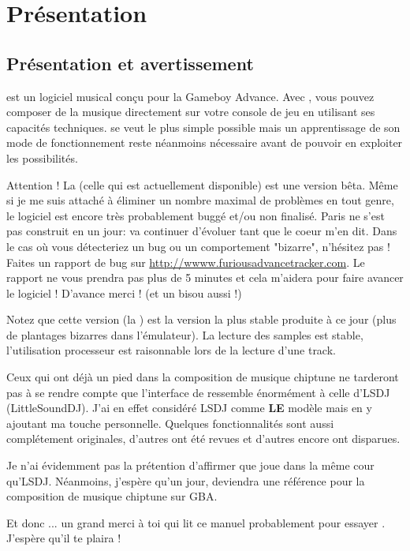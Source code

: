 \documentclass[12pt,a4paper]{article}
\begin{document}
  \section{Présentation}
    \subsection{Présentation et avertissement}
    \FAT est un logiciel musical conçu pour la Gameboy Advance.
    Avec \FAT, vous pouvez composer de la musique directement sur votre console de jeu en utilisant ses capacités techniques.
    \FAT se veut le plus simple possible mais un apprentissage de son mode de fonctionnement reste néanmoins nécessaire avant de pouvoir en exploiter les possibilités.\medskip
    
    Attention ! La \fatversion (celle qui est actuellement disponible) est une version bêta.
    Même si je me suis attaché à éliminer un nombre maximal de problèmes en tout genre, le logiciel est encore très probablement buggé et/ou non finalisé.
    Paris ne s'est pas construit en un jour: \FAT va continuer d'évoluer tant que le coeur m'en dit.
    Dans le cas où vous détecteriez un bug ou un comportement "bizarre", n'hésitez pas !
    Faites un rapport de bug sur \url{http://wwww.furiousadvancetracker.com}.
    Le rapport ne vous prendra pas plus de 5 minutes et cela m'aidera pour faire avancer le logiciel !
    D'avance merci ! (et un bisou aussi !)
    \medskip

    Notez que cette version (la \fatversion) est la version la plus stable produite à ce jour (plus de plantages bizarres dans l'émulateur). La lecture des samples est stable, l'utilisation processeur est raisonnable lors de la lecture d'une track.\medskip
    
    Ceux qui ont déjà un pied dans la composition de musique chiptune ne tarderont pas à se rendre compte que l'interface de \FAT ressemble énormément à celle d'LSDJ (LittleSoundDJ).
    J'ai en effet considéré LSDJ comme {\bf LE} modèle mais en y ajoutant ma touche personnelle.
    Quelques fonctionnalités sont aussi complétement originales, d'autres ont été revues et d'autres encore ont disparues.
    \medskip
    
    Je n'ai évidemment pas la prétention d'affirmer que \FAT joue dans la même cour qu'LSDJ.
    Néanmoins, j'espère qu'un jour, \FAT deviendra une référence pour la composition de musique chiptune sur GBA.\medskip
    
    Et donc ... un grand merci à toi qui lit ce manuel probablement pour essayer \FAT. J'espère qu'il te plaira !
  
\end{document}

